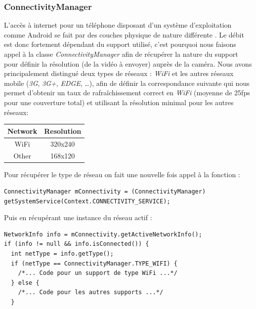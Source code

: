 \subsubsection{ConnectivityManager}
L'accès à internet pour un téléphone disposant d'un système d'exploitation
comme Android se fait par des couches physique de nature différente . Le débit
est donc fortement dépendant du support utilisé, c'est pourquoi nous faisons
appel à la classe \textit{ConnectivityManager} afin de récupérer la nature du
support pour définir la résolution (de la vidéo à envoyer) auprès de la caméra.
Nous avons principalement distingué deux types de réseaux : \textit{WiFi} et les
autres réseaux mobile (\textit{3G}, \textit{3G+}, \textit{EDGE}, \ldots), afin de définir la correspondance suivante qui nous permet d'obtenir un
taux de rafraîchissement correct en \textit{WiFi} (moyenne de 25fps pour une
couverture total) et utilisant la résolution minimal pour les autres réseaux:
\begin{center}
\begin{tabular}{|c|c|}
\hline
Network & Resolution \\
\hline
WiFi &320x240\\
Other &168x120\\
\hline
\end{tabular}
\newline\newline
\end{center}
Pour récupérer le type de réseau on fait une nouvelle fois appel à la
fonction :
\begin{lstlisting}
ConnectivityManager mConnectivity = (ConnectivityManager) getSystemService(Context.CONNECTIVITY_SERVICE);
\end{lstlisting}
Puis en récupérant une instance du réseau actif :
\begin{lstlisting}
NetworkInfo info = mConnectivity.getActiveNetworkInfo();
if (info != null && info.isConnected()) {
  int netType = info.getType();
  if (netType == ConnectivityManager.TYPE_WIFI) {
	/*... Code pour un support de type WiFi ...*/
  } else {
	/*... Code pour les autres supports ...*/
  }
\end{lstlisting}

